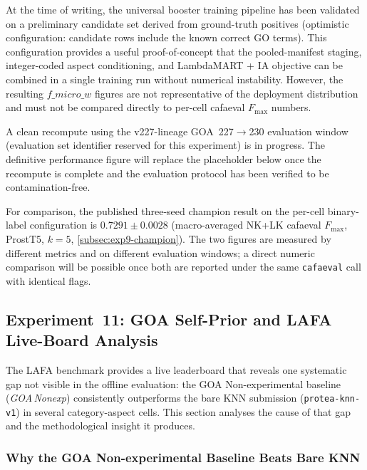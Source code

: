 At the time of writing, the universal booster training pipeline has been
validated on a preliminary candidate set derived from ground-truth positives
(optimistic configuration: candidate rows include the known correct GO terms).
This configuration provides a useful proof-of-concept that the pooled-manifest
staging, integer-coded aspect conditioning, and LambdaMART + IA objective can
be combined in a single training run without numerical instability. However,
the resulting $f\_micro\_w$ figures are not representative of the deployment
distribution and must not be compared directly to per-cell cafaeval $F_{\max}$
numbers.

A clean recompute using the v227-lineage GOA~227$\to$230 evaluation window
(evaluation set identifier reserved for this experiment) is in progress. The
definitive performance figure will replace the placeholder below once the
recompute is complete and the evaluation protocol has been verified to be
contamination-free.

\begin{quote}
\end{quote}

For comparison, the published three-seed champion result on the per-cell
binary-label configuration is $\mathbf{0.7291 \pm 0.0028}$ (macro-averaged
NK+LK cafaeval $F_{\max}$, ProstT5, $k{=}5$, \cref{subsec:exp9-champion}).
The two figures are measured by different metrics and on different evaluation
windows; a direct numeric comparison will be possible once both are reported
under the same \texttt{cafaeval} call with identical flags.

\subsection{Experiment~11: GOA Self-Prior and LAFA Live-Board Analysis}
\label{subsec:exp11-lafa-goa-prior}

The LAFA benchmark provides a live leaderboard that reveals one systematic gap
not visible in the offline evaluation: the GOA Non-experimental baseline
(\textit{GOA\,Nonexp}) consistently outperforms the bare KNN submission
(\texttt{protea-knn-v1}) in several category-aspect cells. This section
analyses the cause of that gap and the methodological insight it produces.

\subsubsection{Why the GOA Non-experimental Baseline Beats Bare KNN}

